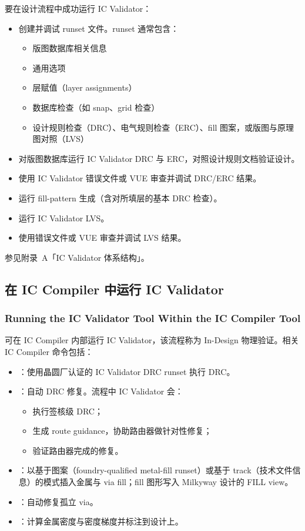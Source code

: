 要在设计流程中成功运行 IC Validator：
\begin{itemize}
  \item 创建并调试 runset 文件。runset 通常包含：
  \begin{itemize}
    \item 版图数据库相关信息
    \item 通用选项
    \item 层赋值（layer assignments）
    \item 数据库检查（如 snap、grid 检查）
    \item 设计规则检查（DRC）、电气规则检查（ERC）、fill 图案，或版图与原理图对照（LVS）
  \end{itemize}
  \item 对版图数据库运行 IC Validator DRC 与 ERC，对照设计规则文档验证设计。
  \item 使用 IC Validator 错误文件或 VUE 审查并调试 DRC/ERC 结果。
  \item 运行 fill-pattern 生成（含对所填层的基本 DRC 检查）。
  \item 运行 IC Validator LVS。
  \item 使用错误文件或 VUE 审查并调试 LVS 结果。
\end{itemize}

\begin{seeAlsoBox}
参见附录~A「IC Validator 体系结构」。
\end{seeAlsoBox}

\subsection{在 IC Compiler 中运行 IC Validator}
\subsubsection*{Running the IC Validator Tool Within the IC Compiler Tool}

可在 IC Compiler 内部运行 IC Validator，该流程称为 In-Design 物理验证。相关 IC Compiler 命令包括：
\begin{itemize}
  \item {}：使用晶圆厂认证的 IC Validator DRC runset 执行 DRC。
  \item {}：自动 DRC 修复。流程中 IC Validator 会：
  \begin{itemize}
    \item 执行签核级 DRC；
    \item 生成 route guidance，协助路由器做针对性修复；
    \item 验证路由器完成的修复。
  \end{itemize}
  \item {}：以基于图案（foundry-qualified metal-fill runset）或基于 track（技术文件信息）的模式插入金属与 via fill；fill 图形写入 Milkyway 设计的 FILL view。
  \item {}：自动修复孤立 via。
  \item {}：计算金属密度与密度梯度并标注到设计上。
\end{itemize}

